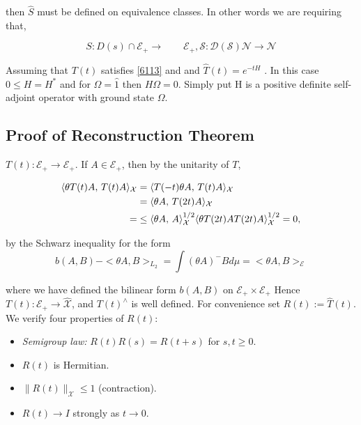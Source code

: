\documentclass{article}
\begin{document}
then $\hat{S}$ must be defined on equivalence classes. In other words we are requiring that, 

\begin{equation}\label{6113}
    S: D(s) \cap  \mathcal{E}_+ \rightarrow \qquad \mathcal{E_{+}, S: D(S) } \mathcal{N} \rightarrow \mathcal{N}
\end{equation}

Assuming that $T(t)$ satisfies \eqref{6113} and and $\hat{T}(t) = e^{-t H}$ . In this case $0 \leq H = H^*$ and for $\Omega= \hat{1}$ then $H \Omega = 0 $. Simply put H is a positive definite self-adjoint operator with ground state $\Omega$. 

\subsection{Proof of Reconstruction Theorem}


 \(T(t)\colon\mathcal{E}_{+}\to\mathcal{E}_{+}\).
If \(A\in\mathcal{E}_{+}\), then by the unitarity of \(T\),

\begin{equation}\label{ 6.1.14}
    \begin{split}
      \langle\theta T(t)A,\,T(t) A\rangle_{\mathcal {X}}
   &=\langle T(-t)\theta A,\,T(t)A\rangle_{\mathcal{ X}}\notag\\
   &=\langle\theta A,\,T(2t)A\rangle_{\mathcal{ X}}\notag\\
  = &\le\langle\theta A,\,A\rangle_{\mathcal{ X}}^{1/2}
        \langle\theta T(2t)AT(2t)A\rangle_{\mathcal{X}}^{1/2}=0,  
    \end{split}
\end{equation}


by the Schwarz inequality for the form
\begin{equation}
    b (A, B) - < \theta A, B >_{L_2}= \int (\theta A)^- B d \mu = < \theta A, B>_\mathcal{E}
\end{equation}

where we have defined the bilinear form $b(A,B)$ on $\mathcal{E}_+ \times \mathcal{E}_+$
Hence \(T(t)\colon\mathcal{E}_{+}\to\widehat{\mathcal{X}}\), and
\(T(t)^{\wedge}\) is well defined.  
For convenience set \(R(t):=\hat{T}(t)\).
We verify four properties of \(R(t)\):

\begin{itemize}
    \item \emph{Semigroup law:} \(R(t)R(s)=R(t+s)\) for \(s,t\ge0\).
\item \(R(t)\) is Hermitian.
\item \(\lVert R(t)\rVert_{\mathcal X}\le1\) (contraction).
\item \(R(t)\to I\) strongly as \(t\to0\). 
\end{itemize}
\end{document}
